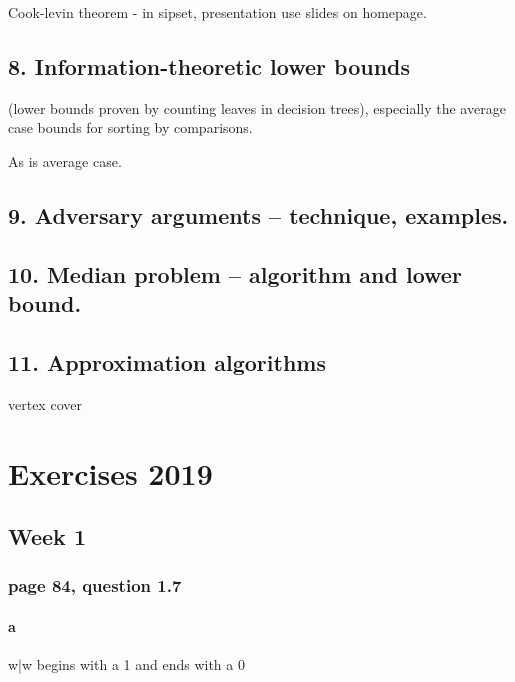 \documentclass[a4paper,10pt,titlepage]{report}
\begin{document}
Cook-levin theorem - in sipset, presentation use slides on homepage.


\newpage
\section{8. Information-theoretic lower bounds}

(lower bounds proven by counting leaves in decision trees), especially the average case bounds for sorting
by comparisons.

As is average case.




\newpage
\section{9. Adversary arguments – technique, examples.}





\newpage
\section{10. Median problem – algorithm and lower bound.}





\newpage
\section{11. Approximation algorithms}

vertex cover



\chapter{Exercises 2019}

\section{Week 1}

\subsection{page 84, question 1.7}

\subsubsection{a}

{w|w begins with a 1 and ends with a 0} \\
\end{document}
